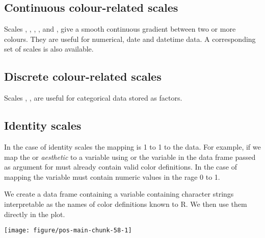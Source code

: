 \documentclass[krantz2]{krantz}\usepackage{knitr}%
\begin{document}
\subsection{Continuous colour-related scales}
\sloppy
Scales , , ,  ,  and , give a smooth continuous gradient between two or more colours. They are useful for numerical, date and datetime data. A corresponding set of  scales is also available.

\subsection{Discrete colour-related scales}

\sloppy
Scales , ,  are useful for categorical data stored as factors.

\subsection{Identity scales}

In the case of identity scales the mapping is 1 to 1 to the data. For example, if we map the  or  \emph{aesthetic} to a variable using  or  the variable in the data frame passed as argument for  must already contain valid color definitions. In the case of mapping  the variable must contain numeric values in the rage 0 to 1.

We create a data frame containing a variable  containing character strings interpretable as the names of color definitions known to R. We then use them directly in the plot.

\begin{knitrout}\footnotesize
{}\color{fgcolor}\begin{kframe}
\begin{alltt}
 \hlkwb{<-} \hlstd{(} \hlstd{=} \hlopt{:}\hlstd{,}  \hlstd{=} \hlstd{(}\hlstd{),}  \hlstd{=} \hlstd{(}\hlstd{(}\hlstd{,} \hlstd{),} \hlstd{))}

    \hlopt{+}
  \hlstd{()} \hlopt{+}
  \hlstd{()}
\end{alltt}
\end{kframe}

{\centering \texttt{[image: figure/pos-main-chunk-58-1]} 

}



\end{knitrout}
\end{document}
